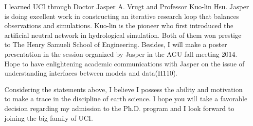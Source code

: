\documentclass{article}
\begin{document}
{I learned UCI through Doctor Jasper A. Vrugt and Professor Kuo-lin Hsu. Jasper is doing excellent work in constructing an iterative research loop that balances observations and simulations. Kuo-lin is the pioneer who first introduced the artificial neutral network in hydrological simulation. Both of them won prestige to The Henry Samueli School of Engineering. Besides, I will make a poster presentation in the session organized by Jasper in the AGU fall meeting 2014. Hope to have enlightening academic communications with Jasper on the issue of understanding interfaces between models and data(H110).

Considering the statements above, I believe I possess the ability and motivation to make a trace in the discipline of earth science. I hope you will take a favorable decision regarding my admission to the Ph.D. program and I look forward to joining the big family of UCI.}

\fi
\end{document}
